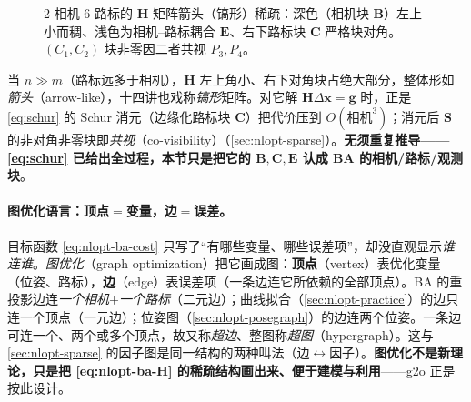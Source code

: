 \begin{figure}[H]\centering
{}
\caption{2 相机 6 路标的 $\mathbf{H}$ 矩阵箭头（镐形）稀疏：深色（相机块 $\mathbf{B}$）左上小而稠、浅色为相机--路标耦合 $\mathbf{E}$、右下路标块 $\mathbf{C}$ 严格块对角。$(C_1,C_2)$ 块非零因二者共视 $P_3,P_4$。}
\label{fig:nlopt-ba-sparsity}
\end{figure}

\noindent 当 $n\gg m$（路标远多于相机），$\mathbf{H}$ 左上角小、右下对角块占绝大部分，整体形如\emph{箭头}（arrow-like），十四讲也戏称\emph{镐形}矩阵。对它解 $\mathbf{H}\Delta\mathbf{x}=\mathbf{g}$ 时，正是 \cref{eq:schur} 的 Schur 消元（边缘化路标块 $\mathbf{C}$）把代价压到 $O(\text{相机}^3)$；消元后 $\mathbf{S}$ 的非对角非零块即\emph{共视}（co-visibility）（\cref{sec:nlopt-sparse}）。\textbf{无须重复推导——\cref{eq:schur} 已给出全过程，本节只是把它的 $\mathbf{B},\mathbf{C},\mathbf{E}$ 认成 BA 的相机/路标/观测块}。

\paragraph{图优化语言：顶点$=$变量，边$=$误差。}\cite{gaoxiang2019slam14}
目标函数 \cref{eq:nlopt-ba-cost} 只写了“有哪些变量、哪些误差项”，却没直观显示\emph{谁连谁}。\emph{图优化}（graph optimization）把它画成图：\textbf{顶点}（vertex）表优化变量（位姿、路标），\textbf{边}（edge）表误差项（一条边连它所依赖的全部顶点）。BA 的重投影边连\emph{一个相机$+$一个路标}（二元边）；曲线拟合（\cref{sec:nlopt-practice}）的边只连一个顶点（一元边）；位姿图（\cref{sec:nlopt-posegraph}）的边连两个位姿。一条边可连一个、两个或多个顶点，故又称\emph{超边}、整图称\emph{超图}（hypergraph）。这与 \cref{sec:nlopt-sparse} 的因子图是同一结构的两种叫法（边$\leftrightarrow$因子）。\textbf{图优化不是新理论，只是把 \cref{eq:nlopt-ba-H} 的稀疏结构画出来、便于建模与利用}——g2o 正是按此设计。

